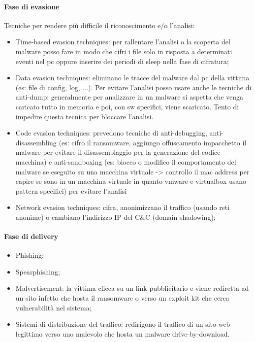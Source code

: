 \paragraph{Fase di evasione}
Tecniche per rendere più difficile il riconoscimento e/o l'analisi:
\begin{itemize}
    \item Time-based evasion techniques: per rallentare l'analisi o la scoperta del malware posso fare in modo che cifri i file solo in risposta a determinati eventi nel pc oppure inserire dei periodi di sleep nella fase di cifratura;
    \item Data evasion techniques: eliminano le tracce del malware dal pc della vittima (es: file di config, log, ...). Per evitare l'analisi posso usare anche le tecniche di anti-dump: generalmente per analizzare in un malware si aspetta che venga caricato tutto in memoria e poi, con sw specifici, viene scaricato. Tento di impedire questa tecnica per bloccare l'analisi.
    \item Code evasion techniques: prevedono tecniche di anti-debugging, anti-disassembling (es: cifro il ransomware, aggiungo offuscamento impacchetto il malware per evitare il disassemblaggio per la generazione del codice macchina) e anti-sandboxing (es: blocco o modifico il comportamento del malware se eseguito su una macchina virtuale -> controllo il mac address per capire se sono in un macchina virtuale in quanto vmware e virtualbox usano pattern specifici) per evitare l'analisi 
    \item Network evasion techniques: cifra, anonimizzano il traffico (usando reti anonime) o cambiano l'indirizzo IP del C\&C (domain shadowing);
\end{itemize}

\paragraph{Fase di delivery}
\begin{itemize}
    \item Phishing;
    \item Spearphishing;
    \item Malvertisement: la vittima clicca su un link pubblicitario e viene rediretta ad un sito infetto che hosta il ransomware o verso un exploit kit che cerca vulnerabilità nel sistema;
    \item Sistemi di distribuzione del traffico: redirigono il traffico di un sito web legittimo verso uno malevolo che hosta un malware drive-by-download.
\end{itemize}

